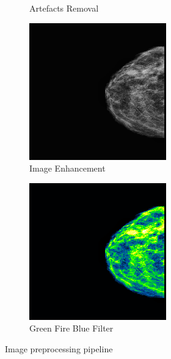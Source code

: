 \documentclass[sn-mathphys,Numbered]{sn-jnl}%
\theoremstyle{thmstyleone}%
\theoremstyle{thmstyletwo}%
\theoremstyle{thmstylethree}%
\begin{document}
\begin{figure}[ht]
\begin{subfigure}{0.22\textwidth}
    \caption{Artefacts Removal}
  \end{subfigure}%
  \hfill
  \begin{subfigure}{0.22\textwidth}
    \centering
    \includegraphics[width=\linewidth]{enhanced.png}
    \caption{Image Enhancement}
  \end{subfigure}%
  \hfill
  \begin{subfigure}{0.22\textwidth}
    \centering
    \includegraphics[width=\linewidth]{green_fire_blue.png}
    \caption{Green Fire Blue Filter}
  \end{subfigure}

  \caption{Image preprocessing pipeline}
  \label{fig:image_preprocessing}
\end{figure}
\end{document}
